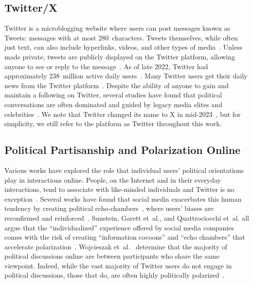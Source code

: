 \subsection{Twitter/X}
Twitter is a microblogging website where users can post messages known as Tweets: messages with at most 280~characters. Tweets themselves, while often just text,  can also include hyperlinks, videos, and other types of media~\cite{jungherr2014twitter}. 
Unless made private, tweets are publicly displayed on the Twitter platform, allowing anyone to see or reply to the message~\cite{karami2020twitter}. 
As of late 2022, Twitter had approximately 238~million active daily users~\cite{Dang2022}. Many Twitter users get their daily news from the Twitter platform~\cite{boukes2019social,tandoc2016most,an2011media}. Despite the ability of anyone to gain and maintain a following on Twitter, several studies have found that political conversations are often dominated and guided by legacy media elites and celebrities~\cite{dagoula2019mapping}. We note that Twitter changed its name to X in mid-2023~\cite{Ivanova2023}, but for simplicity, we still refer to the platform as Twitter throughout this work.




\subsection{Political Partisanship and Polarization Online}
Various works have explored the role that individual users' political orientations play in interactions online. People, on the Internet and in their everyday interactions, tend to associate with like-minded individuals and Twitter is no exception~\cite{kamin2019social,huckfeldt1995political,halberstam2016homophily,barbera2014social,barbera2015tweeting,quattrociocchi2011opinions}. Several works have found that social media exacerbates this human tendency by creating political echo-chambers~\cite{starbird2018ecosystem}, where users' biases are reconfirmed and reinforced~\cite{conover2011predicting,cinelli2020echo,an2014partisan,bessi2016users}. Sunstein, Garett {et~al.}, and Quattrociocchi {et~al.} all argue that the ``individualized'' experience offered by social media companies comes with the risk of creating ``information cocoons'' and ``echo chambers'' that accelerate polarization~\cite{sunstein2018social,garrett2009echo,quattrociocchi2016echo}. Wojcieszak {et~al.}~\cite{wojcieszak2009online} determine that the majority of political discussions online are between participants who share the same viewpoint. Indeed, while the vast majority of Twitter users do not engage in political discussions, those that do, are often highly politically polarized~\cite{wojcieszak2022most}. 

